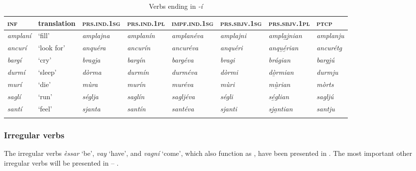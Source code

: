 \begin{sidewaystable} 
	\caption{Verbs ending in \textit{-í}}
	\label{stemalti}
	\begin{tabularx}{\textwidth}{llllllll} 
		\lsptoprule
		\textsc{\textbf{inf}} & \textbf{translation} & \textsc{\textbf{prs.ind.1sg}} & \textsc{\textbf{prs.ind.1pl}} & \textsc{\textbf{impf.ind.1sg}} & \textsc{\textbf{prs.sbjv.1sg}} & \textsc{\textbf{prs.sbjv.1pl}} & \textsc{\textbf{ptcp}}\\
		\midrule
		\textit{amplaní} & `fill' & \textit{amplajna} & \textit{amplanín} & \textit{amplanéva} & \textit{amplajni} & \textit{ampla̱j̱nian} & \textit{amplanju}\\
		\textit{ancurí} & `look for' & \textit{anquéra} & \textit{ancurín} &\textit{ancuréva} & \textit{anquéri} & \textit{anqu̱é̱rian} & \textit{ancurétg}\\
		\textit{bargí} & `cry' & \textit{bragja}  & \textit{bargín} & \textit{bargéva} & \textit{bragi} & \textit{brágian} & \textit{bargjú}\\
		\textit{durmí} & `sleep' & \textit{dòrma} & \textit{durmín} & \textit{durméva} & \textit{dòrmi} & \textit{dò̱rmian} & \textit{durmju}\\
		\textit{murí} & `die' & \textit{mùra} & \textit{murín} & \textit{muréva} & \textit{mùri} & \textit{mù̱rian} & \textit{mòrts}\\
		\textit{saglí} & `run' & \textit{séglja} & \textit{saglín} & \textit{sagljéva} & \textit{ségli} & \textit{sé̱glian} & \textit{sagljú}\\
		\textit{santí} & `feel' & \textit{sjanta} & \textit{santín} & \textit{santéva} & \textit{sjanti} & \textit{sj̱a̱ntian} & \textit{santju}\\
		\lspbottomrule
	\end{tabularx} 
\end{sidewaystable}


\subsubsection{Irregular verbs}\label{sec:4.1.1.4}
The irregular verbs \textit{èssar} `be', \textit{vay} `have', and \textit{vagní} `come',  which also function as , have been presented in . The most important other irregular verbs will be presented in  -- .

